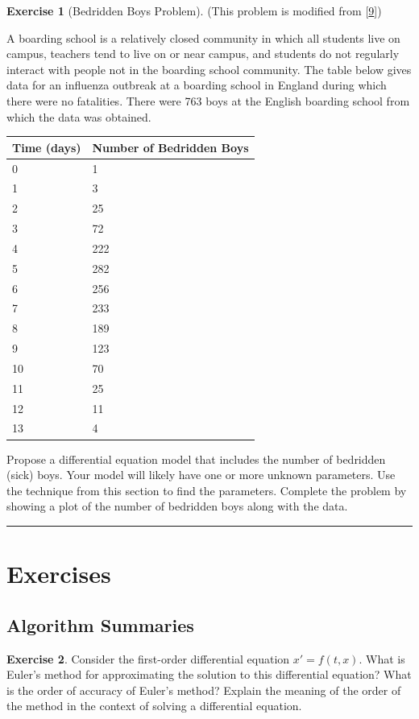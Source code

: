 \documentclass[
]{book}
\theoremstyle{definition}
\theoremstyle{definition}
\theoremstyle{definition}
\newtheorem{exercise}{Exercise}[chapter]
\theoremstyle{remark}
\begin{document}
\begin{exercise}[Bedridden Boys Problem]
\protect\hypertarget{exr:unnamed-chunk-487}{}{\label{exr:unnamed-chunk-487} {} }(This problem is modified from {[}\protect\hyperlink{ref-bedridden}{9}{]})

A boarding school is a relatively closed community in which all students live on campus, teachers tend to live on or near campus, and students do not regularly interact with people not in the boarding school community. The table below gives data for an influenza outbreak at a boarding school in England during which there were no fatalities. There were 763 boys at the English boarding school from which the data was obtained.

\begin{longtable}[]{@{}ll@{}}
\toprule
Time (days) & Number of Bedridden Boys\tabularnewline
\midrule
\endhead
0 & 1\tabularnewline
1 & 3\tabularnewline
2 & 25\tabularnewline
3 & 72\tabularnewline
4 & 222\tabularnewline
5 & 282\tabularnewline
6 & 256\tabularnewline
7 & 233\tabularnewline
8 & 189\tabularnewline
9 & 123\tabularnewline
10 & 70\tabularnewline
11 & 25\tabularnewline
12 & 11\tabularnewline
13 & 4\tabularnewline
\bottomrule
\end{longtable}

Propose a differential equation model that includes the number of bedridden (sick) boys. Your model will likely have one or more unknown parameters. Use the technique from this section to find the parameters. Complete the problem by showing a plot of the number of bedridden boys along with the data.
\end{exercise}

\begin{center}\rule{0.5\linewidth}{0.5pt}\end{center}

\hypertarget{exercises-4}{%
\section{Exercises}\label{exercises-4}}

\hypertarget{algorithm-summaries-3}{%
\subsection{Algorithm Summaries}\label{algorithm-summaries-3}}

\begin{exercise}
\protect\hypertarget{exr:unnamed-chunk-488}{}{\label{exr:unnamed-chunk-488} }Consider the first-order differential equation \(x' = f(t,x)\). What is
Euler's method for approximating the solution to this differential
equation? What is the order of accuracy of Euler's method? Explain the
meaning of the order of the method in the context of solving a
differential equation.
\end{exercise}
\end{document}
